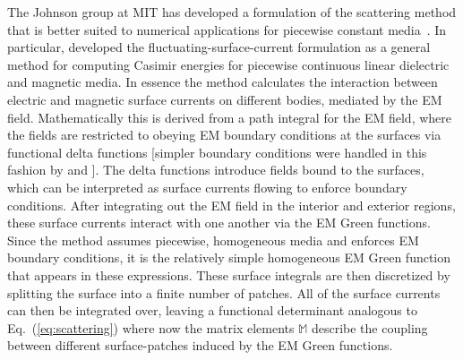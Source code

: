 The Johnson group at MIT has developed a formulation of the scattering method that is better suited to numerical 
applications for piecewise constant media~\citep{Rodriguez2007,Rodriguez2007a, Rodriguez2009,Reid2009,Reid2011, Reid2013}.  
In particular, \citet{Reid2009,Reid2011, Reid2013} developed the fluctuating-surface-current formulation as a general method for computing Casimir
energies for piecewise continuous linear dielectric and magnetic media.  
In essence the method calculates the interaction between electric and magnetic surface currents 
on different bodies, mediated by the EM field.  Mathematically this is derived 
from a path integral for the EM field, where the fields are restricted to obeying EM boundary conditions at the 
surfaces via functional delta functions [simpler boundary conditions were handled in this fashion by
\citet{Bordag1985} and \citet{Li1991}].  The delta functions introduce fields 
bound to the surfaces, which can be interpreted as surface currents flowing to enforce boundary conditions.
After integrating out the EM field in the interior and exterior regions, 
these surface currents interact with one another via the EM Green functions.
Since the method assumes piecewise, homogeneous media and enforces EM boundary
conditions, it is the relatively simple homogeneous EM Green function that appears in these expressions.
These surface integrals are then discretized by splitting the surface into a finite number of patches.
All of the surface currents can then be integrated over, leaving a functional determinant analogous to Eq.~(\ref{eq:scattering})
where now the matrix elements $\mathbb{M}$ describe the coupling between different surface-patches induced
by the EM Green functions.  

